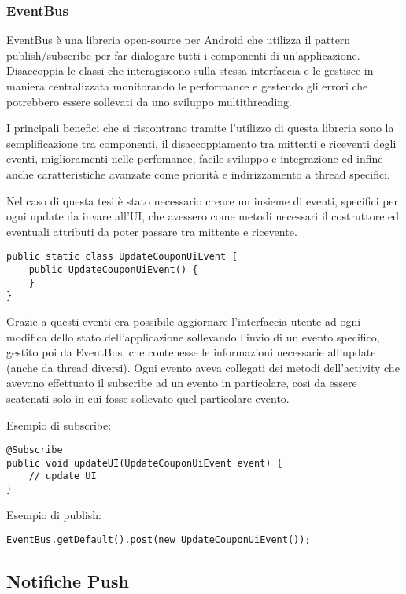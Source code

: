 \subsubsection{EventBus}
EventBus è una libreria open-source per Android che utilizza il pattern publish/subscribe per far dialogare tutti i componenti di un'applicazione.
Disaccoppia le classi che interagiscono sulla stessa interfaccia e le gestisce in maniera centralizzata monitorando le performance e gestendo gli errori che potrebbero essere sollevati da uno sviluppo multithreading.\autocite{GREENROBOT:EVENTBUS}

I principali benefici che si riscontrano tramite l'utilizzo di questa libreria sono la semplificazione tra componenti, il disaccoppiamento tra mittenti e riceventi degli eventi, miglioramenti nelle perfomance, facile sviluppo e integrazione ed infine anche caratteristiche avanzate come priorità e indirizzamento a thread specifici.

Nel caso di questa tesi è stato necessario creare un insieme di eventi, specifici per ogni update da invare all'UI, che avessero come metodi necessari il costruttore ed eventuali attributi da poter passare tra mittente e ricevente.


\begin{lstlisting}
public static class UpdateCouponUiEvent {
	public UpdateCouponUiEvent() {
	}
}
\end{lstlisting}

Grazie a questi eventi era possibile aggiornare l'interfaccia utente ad ogni modifica dello stato dell'applicazione sollevando l'invio di un evento specifico, gestito poi da EventBus, che contenesse le informazioni necessarie all'update (anche da thread diversi).
Ogni evento aveva collegati dei metodi dell'activity che avevano effettuato il subscribe ad un evento in particolare, così da essere scatenati solo in cui fosse sollevato quel particolare evento.

Esempio di subscribe:
\begin{lstlisting}
@Subscribe
public void updateUI(UpdateCouponUiEvent event) {
	// update UI
}
\end{lstlisting}

Esempio di publish:
\begin{lstlisting}
EventBus.getDefault().post(new UpdateCouponUiEvent());
\end{lstlisting}

\subsection{Notifiche Push}

